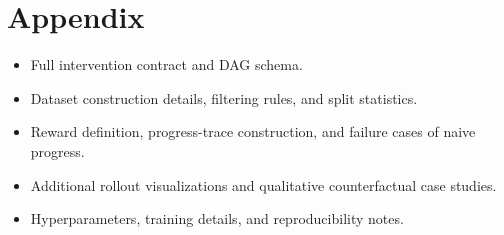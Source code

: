 \documentclass{article}
\begin{document}



\appendix

\section{Appendix}
\label{sec:appendix}
\begin{itemize}
  \item Full intervention contract and DAG schema.
  \item Dataset construction details, filtering rules, and split statistics.
  \item Reward definition, progress-trace construction, and failure cases of naive progress.
  \item Additional rollout visualizations and qualitative counterfactual case studies.
  \item Hyperparameters, training details, and reproducibility notes.
\end{itemize}

\newpage

\end{document}

